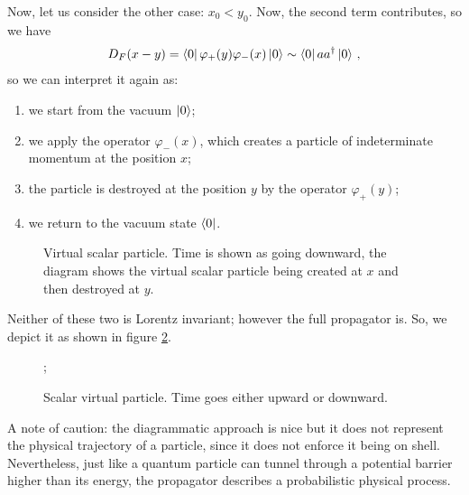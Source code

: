 \documentclass[main.tex]{subfiles}
\begin{document}
Now, let us consider the other case: \(x_0 < y_0 \). Now, the second term contributes, so we have 
%
\begin{align}
D_F (x-y) = \bra{0} \varphi_{+} (y) \varphi_{-} (x) \ket{0} \sim \bra{0} a a ^\dag \ket{0}
\,,
\end{align}
%
so we can interpret it again as: 
\begin{enumerate}
    \item we start from the vacuum \(\ket{0}\);
    \item we apply the operator \(\varphi_{-} (x)\), which creates a particle of indeterminate momentum at the position \(x\);
    \item the particle is destroyed at the position \(y\) by the operator \(\varphi_{+}(y)\);
    \item we return to the vacuum state \(\bra{0}\). 
\end{enumerate}

\begin{figure}[ht]
\centering
{}
\caption{Virtual scalar particle. Time is shown as going downward, the diagram shows the virtual scalar particle being created at \(x\) and then destroyed at \(y\).}
\label{fig:virtual-scalar-particle-diagram-2}
\end{figure}

Neither of these two is Lorentz invariant; however the full propagator is. So, we depict it as shown in figure \ref{fig:virtual-scalar-particle-diagram}.

\begin{figure}[ht]
\centering
{};
\caption{Scalar virtual particle. Time goes either upward or downward.}
\label{fig:virtual-scalar-particle-diagram}
\end{figure}


A note of caution: the diagrammatic approach is nice but it does not represent the physical trajectory of a particle, since it does not enforce it being on shell. 
Nevertheless, just like a quantum particle can tunnel through a potential barrier higher than its energy, the propagator describes a probabilistic physical process.
\end{document}
